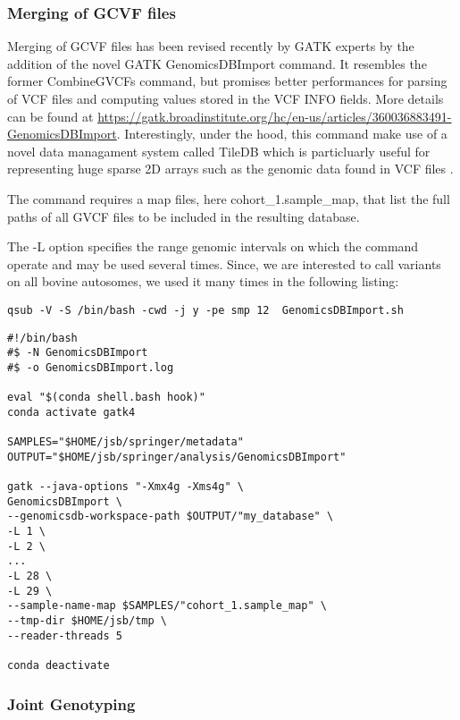 \subsubsection{Merging of GCVF files}

Merging of GCVF files has been revised recently by GATK experts by the addition of the novel GATK GenomicsDBImport command. It resembles the former CombineGVCFs command, but promises better performances for parsing of VCF files and computing values stored in the VCF INFO fields. More details can be found at \href{https://gatk.broadinstitute.org/hc/en-us/articles/360036883491-GenomicsDBImport}{https://gatk.broadinstitute.org/hc/en-us/articles/360036883491-GenomicsDBImport}. Interestingly, under the hood, this command make use of a novel data managament system called  TileDB which is particluarly useful for representing huge sparse 2D arrays such as the genomic data found in VCF files \cite{Papadopoulos2016}. 


The command requires a map files, here cohort\_1.sample\_map, that list the full paths of all GVCF files to be included in the resulting database. 

The -L option specifies the range genomic intervals on which the command operate and may be used several times. Since, we are interested to call variants on all bovine autosomes, we used it many times in the following listing:

\begin{verbatim}
qsub -V -S /bin/bash -cwd -j y -pe smp 12  GenomicsDBImport.sh
\end{verbatim}

\begin{verbatim}
#!/bin/bash
#$ -N GenomicsDBImport
#$ -o GenomicsDBImport.log	
	
eval "$(conda shell.bash hook)"
conda activate gatk4

SAMPLES="$HOME/jsb/springer/metadata"
OUTPUT="$HOME/jsb/springer/analysis/GenomicsDBImport"

gatk --java-options "-Xmx4g -Xms4g" \
GenomicsDBImport \
--genomicsdb-workspace-path $OUTPUT/"my_database" \
-L 1 \
-L 2 \
...
-L 28 \
-L 29 \
--sample-name-map $SAMPLES/"cohort_1.sample_map" \
--tmp-dir $HOME/jsb/tmp \
--reader-threads 5

conda deactivate

\end{verbatim}


\subsubsection{Joint Genotyping}

